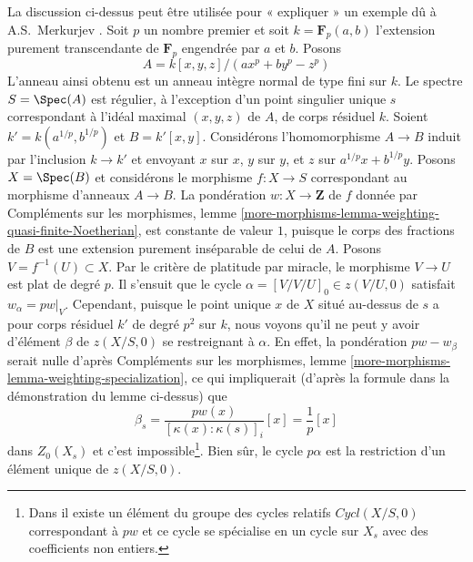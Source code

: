 \begin{example} 
\label{example-Merkurjev} La
 discussion ci-dessus peut être utilisée pour « expliquer » un exemple dû 
à A.S.~Merkurjev \cite[Example 3.5.10]{SV}. Soit  $p$  un nombre premier 
et soit  $k = \mathbf{F}_p(a, b)$  l'extension purement transcendante 
de  $\mathbf{F}_p$ engendrée par  $a$  et  $b$. Posons 
$$
A = k[x, y, z]/(a x^p + b y^p - z^p)
$$
 L'anneau ainsi obtenu est un anneau intègre normal de type fini sur  $k$. Le spectre  
$S = \Spec(A)$ est régulier, à l'exception d'un point singulier unique  $s$
  correspondant à l'idéal maximal  $(x, y, z)$  de  $A$, de corps résiduel  $k$. 
Soient  $k' = k(a^{1/p}, b^{1/p})$  et  $B = k'[x, y]$. Considérons l'homomorphisme  
$A \to B$ induit par l'inclusion  $k \to k'$ et envoyant  $x$  sur  $x$, $y$  sur  $y$,
 et  $z$  sur  $a^{1/p}x + b^{1/p}y$. Posons $X = \Spec(B)$  et considérons le morphisme  
$f : X \to S$  correspondant au morphisme d'anneaux  $A \to B$.
 La pondération  $w : X \to \mathbf{Z}$  de  $f$
  donnée par Compléments sur les morphismes, lemme 
\ref{more-morphisms-lemma-weighting-quasi-finite-Noetherian}, est 
constante de valeur  $1$, puisque le corps des fractions de  $B$  est une extension purement inséparable de 
celui de  $A$. 
Posons  $V = f^{-1}(U) \subset X$. Par le critère de platitude par miracle, le morphisme  
$V \to U$ est plat de degré  $p$. Il s'ensuit que le cycle  
$\alpha = [V/V/U]_0 \in z(V/U, 0)$  satisfait $w_\alpha = pw|_V$.
 Cependant, puisque le point unique  $x$  de  $X$ situé au-dessus de  $s$
  a pour corps résiduel  $k'$  de degré $p^2$  sur  $k$, nous voyons 
qu'il ne peut y avoir d'élément $\beta$  de  $z(X/S, 0)$  se restreignant à  $\alpha$.
 En effet, la pondération $pw - w_\beta$  serait nulle d'après Compléments sur les morphismes,
 lemme \ref{more-morphisms-lemma-weighting-specialization}, ce qui 
impliquerait (d'après la formule dans la démonstration du lemme ci-dessus) que 
$$
\beta_s = \frac{pw(x)}{[\kappa(x) : \kappa(s)]_i} [x] =
\frac{1}{p}[x]
$$
 dans  $Z_0(X_s)$  et c'est impossible\footnote{Dans  \cite{SV}  il existe
 un élément du groupe des cycles relatifs  $Cycl(X/S, 0)$
  correspondant à $pw$  et ce cycle se spécialise en un cycle sur
  $X_s$  avec des coefficients non entiers.}. Bien sûr,
 le cycle  $p\alpha$  est la restriction d'un élément unique de  
$z(X/S, 0)$. 
\end{example} 









